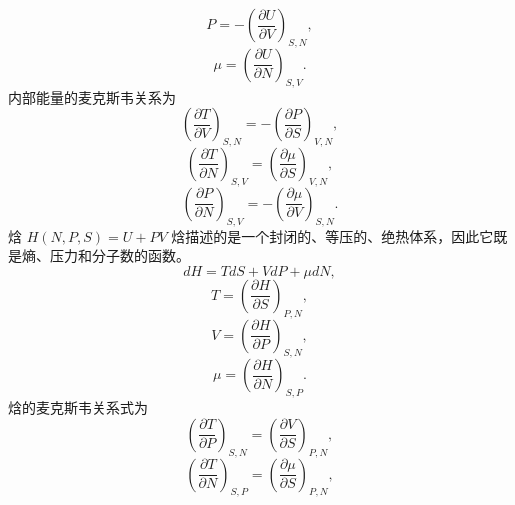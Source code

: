 \begin{equation}\tag{17.11.29}\label{eq:17.11.29}
P = - \left( \frac { \partial U } { \partial V } \right) _ { S , N } ,
\end{equation}
\begin{equation}\tag{17.11.30}\label{eq:17.11.30}
\mu = \left( { \frac { \partial U } { \partial N } } \right) _ { S , V } .
\end{equation}
内部能量的麦克斯韦关系为
\begin{equation}\tag{17.11.31}\label{eq:17.11.31}
\left( \frac { \partial T } { \partial V } \right) _ { S , N } = - \left( \frac { \partial P } { \partial S } \right) _ { V , N } ,
\end{equation}
\begin{equation}\tag{17.11.32}\label{eq:17.11.32}
\left( \frac { \partial T } { \partial N } \right) _ { S , V } = \left( \frac { \partial \mu } { \partial S } \right) _ { V , N } ,
\end{equation}
\begin{equation}\tag{17.11.33}\label{eq:17.11.33}
\left( \frac { \partial P } { \partial N } \right) _ { S , V } = - \left( \frac { \partial \mu } { \partial V } \right) _ { S , N } .
\end{equation}
焓 \(H(N,P,S)=U+PV\)
焓描述的是一个封闭的、等压的、绝热体系，因此它既是熵、压力和分子数的函数。
\begin{equation}\tag{17.11.34}\label{eq:17.11.34}
d H = T d S + V d P + \mu d N ,
\end{equation}
\begin{equation}\tag{17.11.35}\label{eq:17.11.35}
T = \left( \frac { \partial H } { \partial S } \right) _ { P , N } ,
\end{equation}
\begin{equation}\tag{17.11.36}\label{eq:17.11.36}
V = \left( \frac { \partial H } { \partial P } \right) _ { S , N } ,
\end{equation}
\begin{equation}\tag{17.11.37}\label{eq:17.11.37}
\mu = \left( \frac { \partial H } { \partial N } \right) _ { S , P } .
\end{equation}
焓的麦克斯韦关系式为
\begin{equation}\tag{17.11.38}\label{eq:17.11.38}
\left( \frac { \partial T } { \partial P } \right) _ { S , N } = \left( \frac { \partial V } { \partial S } \right) _ { P , N } ,
\end{equation}
\begin{equation}\tag{17.11.39}\label{eq:17.11.39}
\left( \frac { \partial T } { \partial N } \right) _ { S , P } = \left( \frac { \partial \mu } { \partial S } \right) _ { P , N } ,
\end{equation}
